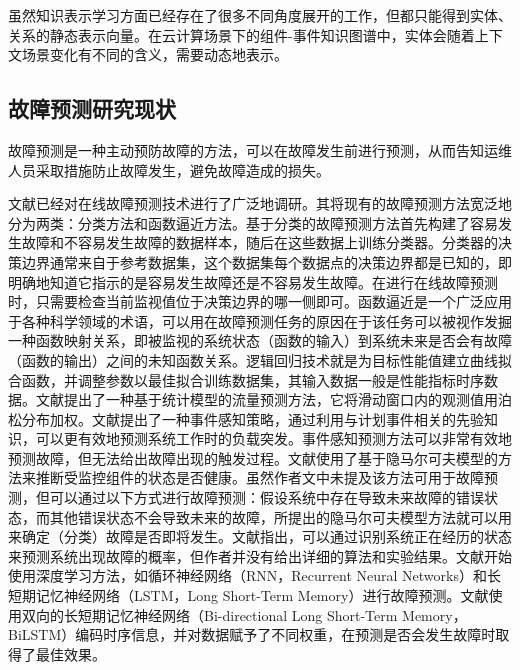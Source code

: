 虽然知识表示学习方面已经存在了很多不同角度展开的工作，但都只能得到实体、关系的静态表示向量。在云计算场景下的组件-事件知识图谱中，实体会随着上下文场景变化有不同的含义，需要动态地表示。

\subsection{故障预测研究现状}
故障预测是一种主动预防故障的方法，可以在故障发生前进行预测，从而告知运维人员采取措施防止故障发生，避免故障造成的损失。

文献\parencite{salfner2010survey}已经对在线故障预测技术进行了广泛地调研。其将现有的故障预测方法宽泛地分为两类：分类方法和函数逼近方法。基于分类的故障预测方法\cite{tan2012prepare,pitakrat2018hora,zhang2018prefix,baldoni2015line}首先构建了容易发生故障和不容易发生故障的数据样本，随后在这些数据上训练分类器。分类器的决策边界通常来自于参考数据集，这个数据集每个数据点的决策边界都是已知的，即明确地知道它指示的是容易发生故障还是不容易发生故障。在进行在线故障预测时，只需要检查当前监视值位于决策边界的哪一侧即可。函数逼近是一个广泛应用于各种科学领域的术语，可以用在故障预测任务的原因在于该任务可以被视作发掘一种函数映射关系，即被监视的系统状态（函数的输入）到系统未来是否会有故障（函数的输出）之间的未知函数关系。逻辑回归技术就是为目标性能值建立曲线拟合函数，并调整参数以最佳拟合训练数据集，其输入数据一般是性能指标时序数据\cite{salfner2010survey}。文献\parencite{dalmazo2013predicting}提出了一种基于统计模型的流量预测方法，它将滑动窗口内的观测值用泊松分布加权。文献\parencite{sladescu2012event}提出了一种事件感知策略，通过利用与计划事件相关的先验知识，可以更有效地预测系统工作时的负载突发。事件感知预测方法可以非常有效地预测故障，但无法给出故障出现的触发过程。文献\parencite{purushotham2005multi}使用了基于隐马尔可夫模型的方法来推断受监控组件的状态是否健康。虽然作者文中未提及该方法可用于故障预测，但可以通过以下方式进行故障预测：假设系统中存在导致未来故障的错误状态，而其他错误状态不会导致未来的故障，所提出的隐马尔可夫模型方法就可以用来确定（分类）故障是否即将发生。文献\parencite{boutros2011detection}指出，可以通过识别系统正在经历的状态来预测系统出现故障的概率，但作者并没有给出详细的算法和实验结果。文献\parencite{xu2016health,cheng2018machine,du2017deeplog,das2018desh,islam2017predicting,li2020predicting}开始使用深度学习方法，如循环神经网络（RNN，Recurrent Neural Networks）和长短期记忆神经网络（LSTM，Long Short-Term Memory）进行故障预测。文献\parencite{gao2020task}使用双向的长短期记忆神经网络（Bi-directional Long Short-Term Memory，BiLSTM）编码时序信息，并对数据赋予了不同权重，在预测是否会发生故障时取得了最佳效果。

